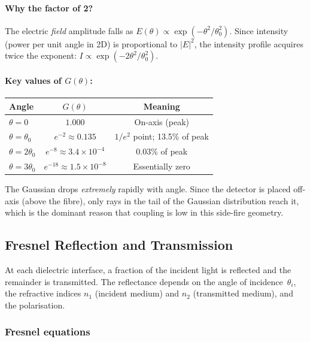 \paragraph{Why the factor of 2?}
The electric \emph{field} amplitude falls as
$E(\theta) \propto \exp(-\theta^2/\theta_0^2)$.
Since intensity (power per unit angle in 2D) is proportional to
$|E|^2$, the intensity profile acquires twice the exponent:
$I \propto \exp(-2\theta^2/\theta_0^2)$.

\paragraph{Key values of $G(\theta)$:}
\begin{center}
\begin{tabular}{@{}lcc@{}}
\toprule
\textbf{Angle} & $G(\theta)$ & \textbf{Meaning} \\
\midrule
$\theta = 0$         & $1.000$        & On-axis (peak) \\
$\theta = \theta_0$  & $e^{-2} \approx 0.135$ & $1/e^2$ point; 13.5\% of peak \\
$\theta = 2\theta_0$ & $e^{-8} \approx 3.4\times10^{-4}$ & 0.03\% of peak \\
$\theta = 3\theta_0$ & $e^{-18}\approx 1.5\times10^{-8}$ & Essentially zero \\
\bottomrule
\end{tabular}
\end{center}

\noindent
The Gaussian drops \emph{extremely} rapidly with angle.  Since the
detector is placed off-axis (above the fibre), only rays in the tail of
the Gaussian distribution reach it, which is the dominant reason that
coupling is low in this side-fire geometry.

\subsection{Fresnel Reflection and Transmission}

At each dielectric interface, a fraction of the incident light is
reflected and the remainder is transmitted.  The reflectance depends on
the angle of incidence~$\theta_i$, the refractive indices $n_1$
(incident medium) and $n_2$ (transmitted medium), and the polarisation.

\subsubsection{Fresnel equations}

